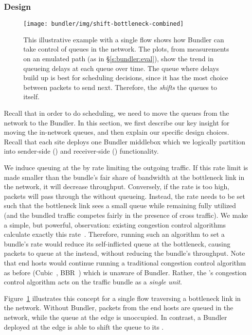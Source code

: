 \subsubsection{Design}\label{s:bundler:design}
\begin{figure}
    \centering
    \texttt{[image: bundler/img/shift-bottleneck-combined]}
    \caption{This illustrative example with a single flow shows how Bundler can take control of queues in the network. The plots, from measurements on an emulated path (as in \S\ref{s:bundler:eval}), show the trend in queueing delays at each queue over time. The queue where delays build up is best for scheduling decisions, since it has the most choice between packets to send next. Therefore, the \inbox \emph{shifts} the queues to itself.}\label{fig:design:shift-bottleneck}
\end{figure}

Recall that in order to do scheduling, we need to move the queues from the network to the Bundler. 
In this section, we first describe our key insight for moving the in-network queues, and then explain our specific design choices. 
Recall that each site deploys one Bundler middlebox which we logically partition into sender-side (\inbox) and receiver-side (\outbox) functionality.

We induce queuing at the \inbox by rate limiting the outgoing traffic. 
If this rate limit is made smaller than the bundle's fair share of bandwidth at the bottleneck link in the network, it will decrease throughput. 
Conversely, if the rate is too high, packets will pass through the \inbox without queueing.
Instead, the rate needs to be set such that the bottleneck link sees a small queue while remaining fully utilized (and the bundled traffic competes fairly in the presence of cross traffic). 
We make a simple, but powerful, observation: existing congestion control algorithms calculate exactly this rate~\cite{Jacobson88}. 
Therefore, running such an algorithm to set a bundle's rate would reduce its self-inflicted queue at the bottleneck, causing packets to queue at the \inbox instead, without reducing the bundle's throughput.
Note that end hosts would continue running a traditional congestion control algorithm as before (\eg Cubic~\cite{cubic}, BBR~\cite{bbr}) which is unaware of Bundler.
Rather, the \inbox's congestion control algorithm acts on the traffic bundle as a \emph{single unit}.

Figure~\ref{fig:design:shift-bottleneck} illustrates this concept for a single flow traversing a bottleneck link in the 
network.
Without Bundler, packets from the end hosts are queued in the network, while the queue at the edge is unoccupied. 
In contrast, a Bundler deployed at the edge is able to shift the queue to its \inbox.

